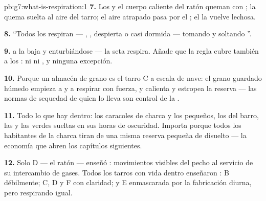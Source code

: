 \begin{solution}{pb:g7:what-is-respiration:1}
\textbf{7.} Los  y el cuerpo caliente del ratón queman
 con ; la quema suelta  al aire del
tarro; el aire atrapado pasa por el ; el 
la vuelve lechosa.

\textbf{8.} ``Todos los  respiran --- , ,
 despierta o casi dormida --- tomando  y soltando ''.

\textbf{9.}  a la baja y  enturbiándose --- la seta
respira. Añade que la regla cubre también a los : ni  ni
, y ninguna excepción.

\textbf{10.} Porque un almacén de grano es el tarro C a escala de nave:
el grano guardado húmedo empieza a  y a respirar con fuerza, y
calienta y estropea la reserva --- las normas de sequedad de quien lo
lleva son control de la .

\textbf{11.} Todo lo que hay dentro: los caracoles de charca y los
 pequeños, los  del barro, las  y las
 verdes sueltas en sus horas de oscuridad. Importa porque todos
los habitantes de la charca tiran de una misma reserva pequeña de
 disuelto --- la economía que abren los capítulos siguientes.

\textbf{12.} Solo D --- el ratón --- enseñó : movimientos
visibles del pecho al servicio de su intercambio de gases. Todos los
tarros con vida dentro enseñaron : B débilmente; C, D y F
con claridad; y E enmascarada por la fabricación diurna, pero
respirando igual.
\end{solution}
